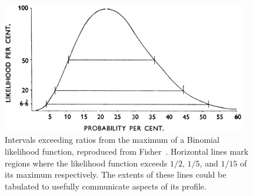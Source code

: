 \begin{figure}[tp]
\centering
\includegraphics[width=0.95\textwidth]{figures/searches_fisher_likelihood_binomial.png}
\caption[
Intervals exceeding ratios from the maximum of a Binomial likelihood function,
reproduced from Fisher
]{%
Intervals exceeding ratios from the maximum of a Binomial likelihood function,
reproduced from Fisher~\cite{fisher1956statistical}.
Horizontal lines mark regions where the likelihood function exceeds
$1/2$, $1/5$, and $1/15$ of its maximum respectively.
The extents of these lines could be tabulated to usefully communicate aspects
of its profile.
}
\label{fig:searches_fisher_likelihood}
\end{figure}

